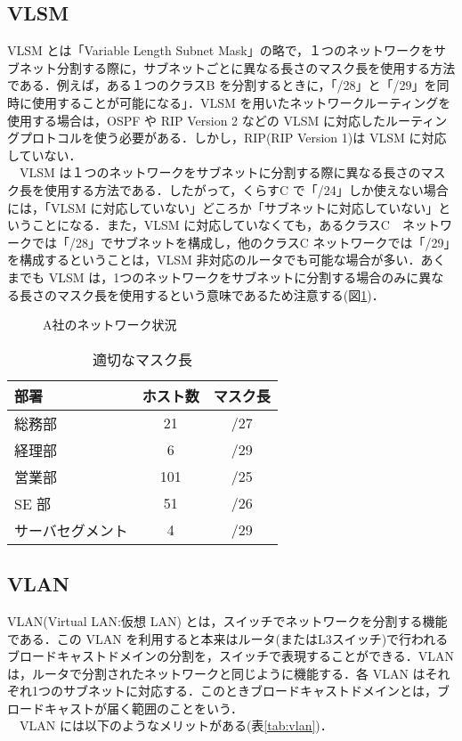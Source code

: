 \documentclass[a4j,titlepage]{jarticle}
\begin{document}
\subsection{VLSM}
VLSM とは「Variable Length Subnet Mask」の略で，１つのネットワークをサブネット分割する際に，サブネットごとに異なる長さのマスク長を使用する方法である．例えば，ある１つのクラスB を分割するときに，「/28」と「/29」を同時に使用することが可能になる」．VLSM を用いたネットワークルーティングを使用する場合は，OSPF や RIP Version 2 などの VLSM  に対応したルーティングプロトコルを使う必要がある．しかし，RIP(RIP Version 1)は VLSM に対応していない．\\
  　VLSM は１つのネットワークをサブネットに分割する際に異なる長さのマスク長を使用する方法である．したがって，くらすC で「/24」しか使えない場合には，「VLSM に対応していない」どころか「サブネットに対応していない」ということになる．また，VLSM に対応していなくても，あるクラスC　ネットワークでは「/28」でサブネットを構成し，他のクラスC ネットワークでは「/29」を構成するということは，VLSM 非対応のルータでも可能な場合が多い．あくまでも VLSM は，1つのネットワークをサブネットに分割する場合のみに異なる長さのマスク長を使用するという意味であるため注意する(図\ref{fig:vlsm})\cite{bib:routing}．

  \begin{figure}[htbp]
    \begin{center}
      \caption{A社のネットワーク状況\cite{bib:routing}}
     \label{fig:vlsm}
   \end{center}
  \end{figure}


\begin{table}[htbp]
\caption{適切なマスク長\cite{bib:routing}}
\label{tab:routing}
\begin{center}
\begin{tabular}{lcc}
\hline
部署 & ホスト数 & マスク長\\ \hline \hline  
総務部 & 21 & /27\\
経理部 & 6 & /29\\
営業部 & 101 & /25\\ 
SE 部 &  51 & /26\\
サーバセグメント & 4 & /29\\ \hline
\end{tabular}
\end{center}
\end{table}


\newpage
\subsection{VLAN}
VLAN(Virtual LAN:仮想 LAN) とは，スイッチでネットワークを分割する機能である．この VLAN を利用すると本来はルータ(またはL3スイッチ)で行われるブロードキャストドメインの分割を，スイッチで表現することができる．VLAN は，ルータで分割されたネットワークと同じように機能する．各 VLAN はそれぞれ1つのサブネットに対応する．このときブロードキャストドメインとは，ブロードキャストが届く範囲のことをいう．\\
　VLAN には以下のようなメリットがある(表\ref{tab:vlan})．
\end{document}
